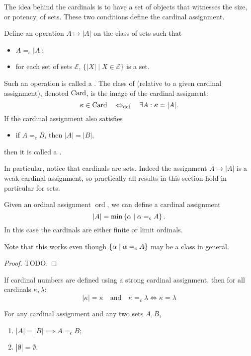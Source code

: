 The idea behind the cardinals is to have a set of objects that witnesses the size, or potency, of sets. These two conditions define the cardinal assignment.
\begin{definition}
Define an operation $A\mapsto |A|$ on the class of sets such that
\begin{itemize}
\item $A=_c |A|$;
\item for each set of sets $\mathcal{E}$, $\{ |X|\;|\; X\in\mathcal{E} \}$ is a set.
\end{itemize}
Such an operation is called a . The class of (relative to a given
cardinal assignment), denoted $\operatorname{Card}$, is the image of the cardinal assigment:
\[ \kappa \in \operatorname{Card} \quad\Leftrightarrow_{\text{def}}\quad \exists A: \kappa = |A|. \]
If the cardinal assignment also satisfies
\begin{itemize}
\item if $A=_c B$, then $|A|=|B|$,
\end{itemize}
then it is called a .
\end{definition}
In particular, notice that cardinals are sets. Indeed the assignment $A\mapsto |A|$ is a weak cardinal assignment, so practically all results in this section hold in particular for sets.

\begin{proposition} \label{cardinalsFromOrdinals}
Given an ordinal assignment $\operatorname{ord}$, we can define a cardinal assignment
\[ |A| = \min\left\{ \alpha \;\middle|\; \alpha =_c A \right\}. \]
In this case the cardinals are either finite or limit ordinals.
\end{proposition}
Note that this works even though $\left\{ \alpha \;\middle|\; \alpha =_c A \right\}$ may be a class in general.
\begin{proof}
TODO.
\end{proof}

\begin{lemma}
If cardinal numbers are defined using a strong cardinal assignment, then for all cardinals $\kappa,\lambda$:
\[ |\kappa| = \kappa \quad \text{and}\quad \kappa =_c\lambda \iff \kappa = \lambda \]
\end{lemma}

\begin{lemma}
For any cardinal assignment and any two sets $A,B$,
\begin{enumerate}
\item $|A| = |B| \implies A=_c B$;
\item $|\emptyset| = \emptyset$.
\end{enumerate}
\end{lemma}

